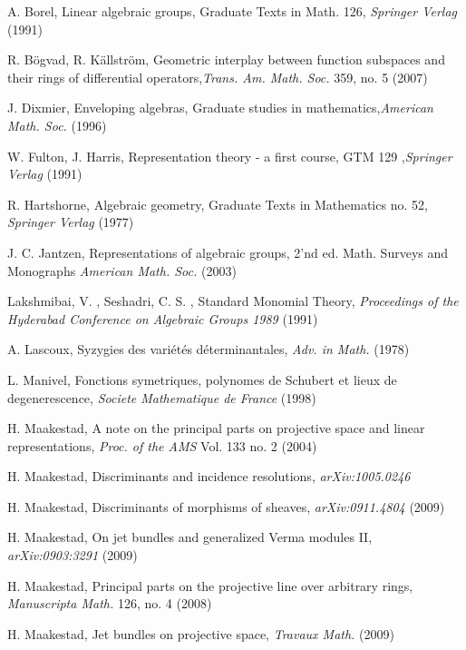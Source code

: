 \documentclass{amsart}
\theoremstyle{plain}
\theoremstyle{definition}
\theoremstyle{remark}
\numberwithin{equation}{theorem}
\begin{document}
\begin{thebibliography}{4}

 A. Borel, Linear algebraic groups, Graduate Texts in
  Math. 126, \emph{Springer Verlag} (1991)

 R. B\"{o}gvad, R. K\"{a}llstr\"{o}m, Geometric
  interplay between function subspaces and their rings of differential
  operators,\emph{Trans. Am. Math. Soc.} 359, no. 5 (2007)

 J. Dixmier, Enveloping algebras, Graduate studies in
  mathematics,\emph{American Math. Soc.} (1996)

 W. Fulton, J. Harris, Representation theory - a first
  course, GTM 129 ,\emph{Springer Verlag} (1991)

 R. Hartshorne, Algebraic geometry, Graduate Texts in 
Mathematics no. 52, \emph{Springer Verlag} (1977)

 J. C. Jantzen, Representations of algebraic groups,
  2'nd ed. Math. Surveys and Monographs \emph{American Math. Soc.} (2003)

 Lakshmibai, V. , Seshadri, C. S. , Standard
  Monomial Theory, \emph{Proceedings of the Hyderabad Conference on
  Algebraic Groups 1989} (1991)

 A. Lascoux, Syzygies des vari\'{e}t\'{e}s
  d\'{e}terminantales, \emph{Adv. in Math.} (1978)

 L. Manivel, Fonctions symetriques, polynomes de
  Schubert et lieux de degenerescence, \emph{Societe Mathematique de
  France} (1998) 

 H. Maakestad, A note on the principal parts on
  projective space and linear representations,
\emph{Proc. of the AMS} Vol. 133 no. 2 (2004) 

 H. Maakestad, Discriminants and incidence resolutions, \emph{arXiv:1005.0246}

 H. Maakestad, Discriminants of morphisms of sheaves,
  \emph{arXiv:0911.4804} (2009)

 H. Maakestad, On jet bundles and generalized Verma
  modules II, \emph{arXiv:0903:3291} (2009) 

 H. Maakestad, Principal parts on the projective line
  over arbitrary rings, \emph{Manuscripta Math.} 126, no. 4 (2008) 

 H. Maakestad,  Jet bundles on projective space,
  \emph{Travaux Math.} (2009)


\end{thebibliography}
\end{document}
